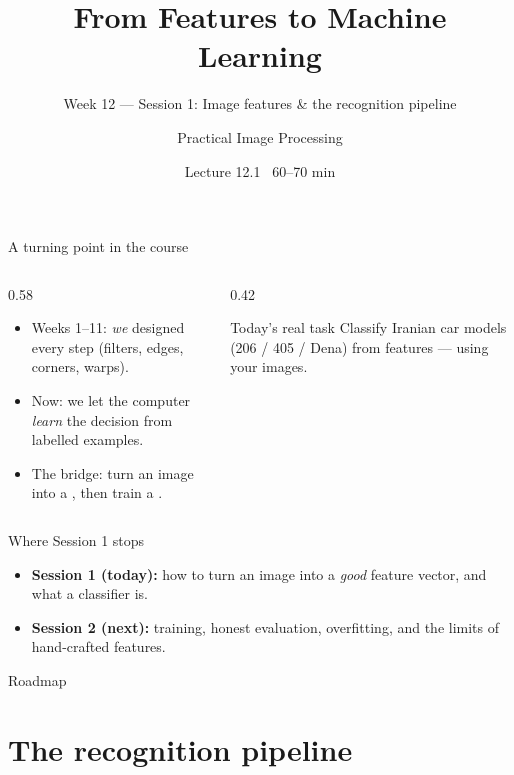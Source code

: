 \documentclass[10pt,aspectratio=169]{beamer}
\title{From Features to Machine Learning}
\subtitle{Week 12 — Session 1: Image features \& the recognition pipeline}
\author{Practical Image Processing}
\date{Lecture 12.1 \textbullet\ 60--70 min}
\begin{document}
\maketitle

\begin{frame}{A turning point in the course}
  \begin{columns}[T]
    \begin{column}{0.58\textwidth}
      \begin{itemize}
        \item Weeks 1--11: \emph{we} designed every step (filters, edges, corners, warps).
        \item \alert{Now:} we let the computer \emph{learn} the decision from labelled examples.
        \item The bridge: turn an image into a , then train a .
      \end{itemize}
    \end{column}
    \begin{column}{0.42\textwidth}
      \begin{alertblock}{Today's real task}
        Classify Iranian car models (206 / 405 / Dena) from  features — using your
         images.
      \end{alertblock}
    \end{column}
  \end{columns}
\end{frame}

\begin{frame}{Where Session 1 stops}
  \begin{itemize}
    \item \textbf{Session 1 (today):} how to turn an image into a \emph{good} feature vector, and what a classifier is.
    \item \textbf{Session 2 (next):} training, honest evaluation, overfitting, and the limits of hand-crafted features.
  \end{itemize}
\end{frame}

\begin{frame}{Roadmap}\tableofcontents\end{frame}

\section{The recognition pipeline}
\end{document}
